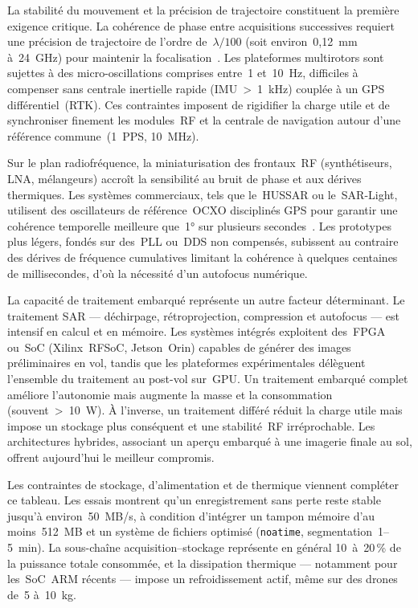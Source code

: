 La stabilité du mouvement et la précision de trajectoire constituent la première exigence critique. La cohérence de phase entre acquisitions successives requiert une précision de trajectoire de l’ordre de~$\lambda/100$ (soit environ~0{,}12~mm à~24~GHz) pour maintenir la focalisation~\cite{Aguasca2013_ARBRES_UAV_SAR}. Les plateformes multirotors sont sujettes à des micro-oscillations comprises entre~1 et~10~Hz, difficiles à compenser sans centrale inertielle rapide (IMU~>~1~kHz) couplée à un GPS différentiel~(RTK). Ces contraintes imposent de rigidifier la charge utile et de synchroniser finement les modules~RF et la centrale de navigation autour d’une référence commune~(1~PPS, 10~MHz).

Sur le plan radiofréquence, la miniaturisation des frontaux~RF (synthétiseurs, LNA, mélangeurs) accroît la sensibilité au bruit de phase et aux dérives thermiques. Les systèmes commerciaux, tels que le~HUSSAR ou le~SAR-Light, utilisent des oscillateurs de référence~OCXO disciplinés GPS pour garantir une cohérence temporelle meilleure que~1° sur plusieurs secondes~\cite{HUSSAR2025,Angelliaume2022}. Les prototypes plus légers, fondés sur des~PLL ou~DDS non compensés, subissent au contraire des dérives de fréquence cumulatives limitant la cohérence à quelques centaines de millisecondes, d’où la nécessité d’un autofocus numérique.

La capacité de traitement embarqué représente un autre facteur déterminant. Le traitement SAR — déchirpage, rétroprojection, compression et autofocus — est intensif en calcul et en mémoire. Les systèmes intégrés exploitent des~FPGA ou~SoC (Xilinx~RFSoC, Jetson~Orin) capables de générer des images préliminaires en vol, tandis que les plateformes expérimentales délèguent l’ensemble du traitement au post-vol sur~GPU. Un traitement embarqué complet améliore l’autonomie mais augmente la masse et la consommation (souvent~>~10~W). À l’inverse, un traitement différé réduit la charge utile mais impose un stockage plus conséquent et une stabilité~RF irréprochable. Les architectures hybrides, associant un aperçu embarqué à une imagerie finale au sol, offrent aujourd’hui le meilleur compromis.

Les contraintes de stockage, d’alimentation et de thermique viennent compléter ce tableau. Les essais montrent qu’un enregistrement sans perte reste stable jusqu’à environ~50~MB/s, à condition d’intégrer un tampon mémoire d’au moins~512~MB et un système de fichiers optimisé (\texttt{noatime}, segmentation~1–5~min). La sous-chaîne acquisition–stockage représente en général 10~à~20\,\% de la puissance totale consommée, et la dissipation thermique — notamment pour les~SoC~ARM récents — impose un refroidissement actif, même sur des drones de~5 à~10~kg.

